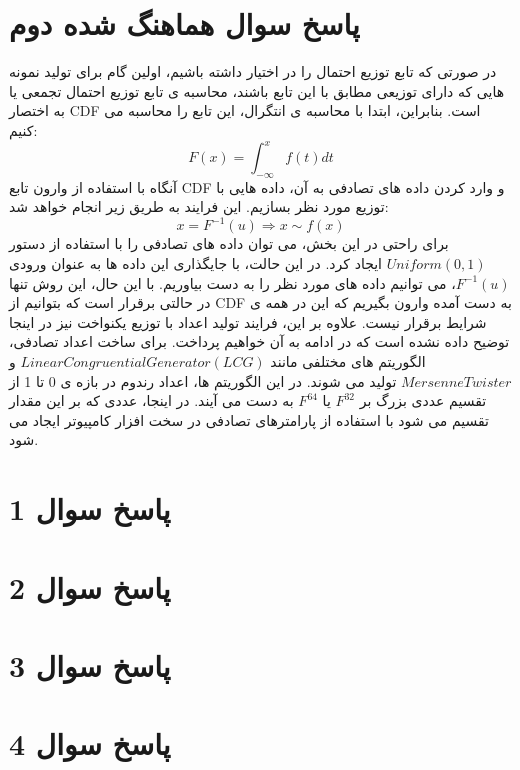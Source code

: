 \documentclass{article}
\begin{document}
\section{پاسخ سوال هماهنگ شده دوم}
در صورتی که تابع توزیع احتمال را در اختیار داشته باشیم، اولین گام برای تولید نمونه هایی که دارای توزیعی مطابق با این تابع باشند، محاسبه ی تابع توزیع احتمال تجمعی یا به اختصار CDF است. بنابراین، ابتدا با محاسبه ی انتگرال، این تابع را محاسبه می کنیم:
\begin{equation}
	F(x) = \int_{-\infty}^{x} f(t) dt
\end{equation}
آنگاه با استفاده از وارون تابع CDF و وارد کردن داده های تصادفی به آن، داده هایی با توزیع مورد نظر بسازیم. این فرایند به طریق زیر انجام خواهد شد:
\begin{equation}
	x = F^{-1}(u) \Rightarrow x \sim f(x)
\end{equation}
برای راحتی در این بخش، می توان داده های تصادفی را با استفاده از دستور $Uniform(0,1)$ ایجاد کرد. در این حالت، با جایگذاری این داده ها به عنوان ورودی $ F^{-1}(u)$، می توانیم داده های مورد نظر را به دست بیاوریم. با این حال، این روش تنها در حالتی برقرار است که بتوانیم از CDF به دست آمده وارون بگیریم که این در همه ی شرایط برقرار نیست. علاوه بر این، فرایند تولید اعداد با توزیع یکنواخت نیز در اینجا توضیح داده نشده است که در ادامه به آن خواهیم پرداخت.
برای ساخت اعداد تصادفی، الگوریتم های مختلفی مانند $Linear Congruential Generator (LCG)$ و $Mersenne Twister$ تولید می شوند. در این الگوریتم ها، اعداد رندوم در بازه ی 0 تا 1 از تقسیم عددی بزرگ بر $ F^{32}$ یا $ F^{64}$ به دست می آیند. در اینجا، عددی که بر این مقدار تقسیم می شود با استفاده از پارامترهای تصادفی در سخت افزار کامپیوتر ایجاد می شود.

\section{پاسخ سوال 1}

\section{پاسخ سوال 2}

\section{پاسخ سوال 3}

\section{پاسخ سوال 4}
\end{document}
